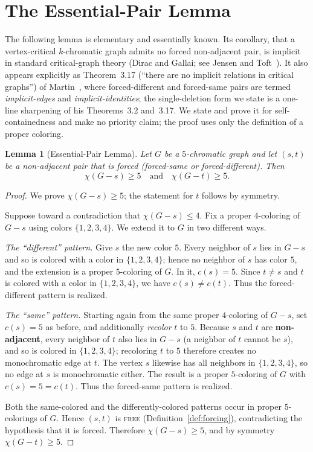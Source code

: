 \documentclass[11pt]{article}
\newtheorem{lemma}{Lemma}
\theoremstyle{definition}
\newcommand{\chrom}{\chi}
\begin{document}
\section{The Essential-Pair Lemma}
\label{sec:lemma}

The following lemma is elementary and essentially known. Its corollary, that a
vertex-critical $k$-chromatic graph admits no forced non-adjacent pair, is
implicit in standard critical-graph theory (Dirac and Gallai; see Jensen and
Toft~\cite{JensenToft1995}). It also appears explicitly as Theorem~3.17
(``there are no implicit relations in critical graphs'') of
Martin~\cite{Martin2009}, where forced-different and forced-same pairs are termed
\emph{implicit-edges} and \emph{implicit-identities}; the single-deletion form we
state is a one-line sharpening of his Theorems~3.2 and~3.17. We state and prove it
for self-containedness and make no priority claim; the proof uses only the
definition of a proper coloring.

\begin{lemma}[Essential-Pair Lemma]
\label{lem:essential}
Let $G$ be a $5$-chromatic graph and let $(s,t)$ be a non-adjacent pair that is
\emph{forced} (forced-same or forced-different). Then
\[
  \chrom(G - s) \ge 5 \quad\text{and}\quad \chrom(G - t) \ge 5.
\]
\end{lemma}

\begin{proof}
We prove $\chrom(G - s) \ge 5$; the statement for $t$ follows by symmetry.

Suppose toward a contradiction that $\chrom(G - s) \le 4$. Fix a proper
$4$-coloring of $G - s$ using colors $\{1,2,3,4\}$. We extend it to $G$ in two
different ways.

\emph{The ``different'' pattern.} Give $s$ the new color $5$. Every neighbor of
$s$ lies in $G - s$ and so is colored with a color in $\{1,2,3,4\}$; hence no
neighbor of $s$ has color $5$, and the extension is a proper $5$-coloring of $G$.
In it, $c(s) = 5$. Since $t \ne s$ and $t$ is colored with a color in
$\{1,2,3,4\}$, we have $c(s) \ne c(t)$. Thus the forced-different pattern is
realized.

\emph{The ``same'' pattern.} Starting again from the same proper $4$-coloring of
$G - s$, set $c(s) = 5$ as before, and additionally \emph{recolor} $t$ to $5$.
Because $s$ and $t$ are \textbf{non-adjacent}, every neighbor of $t$ also lies in
$G - s$ (a neighbor of $t$ cannot be $s$), and so is colored in $\{1,2,3,4\}$;
recoloring $t$ to $5$ therefore creates no monochromatic edge at $t$. The vertex
$s$ likewise has all neighbors in $\{1,2,3,4\}$, so no edge at $s$ is
monochromatic either. The result is a proper $5$-coloring of $G$ with
$c(s) = 5 = c(t)$. Thus the forced-same pattern is realized.

Both the same-colored and the differently-colored patterns occur in proper
$5$-colorings of $G$. Hence $(s,t)$ is \textsc{free}
(Definition~\ref{def:forcing}), contradicting the hypothesis that it is forced.
Therefore $\chrom(G - s) \ge 5$, and by symmetry $\chrom(G - t) \ge 5$.
\end{proof}
\end{document}
